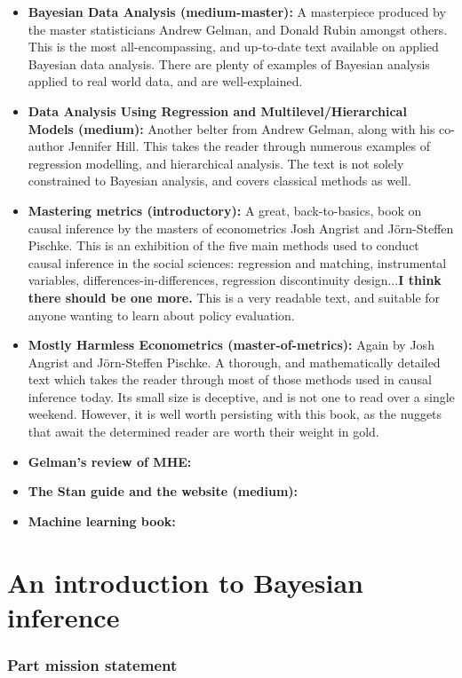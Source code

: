 \documentclass[11pt,fullpage]{book}
\begin{document}
\begin{itemize}
\item \textbf{Bayesian Data Analysis (medium-master): } A masterpiece produced by the master statisticians Andrew Gelman, and Donald Rubin amongst others. This is the most all-encompassing, and up-to-date text available on applied Bayesian data analysis. There are plenty of examples of Bayesian analysis applied to real world data, and are well-explained\cite{gelman2013bayesian}.
\item \textbf{Data Analysis Using Regression and Multilevel/Hierarchical Models (medium): } Another belter from Andrew Gelman, along with his co-author Jennifer Hill. This takes the reader through numerous examples of regression modelling, and hierarchical analysis. The text is not solely constrained to Bayesian analysis, and covers classical methods as well.
\item \textbf{Mastering metrics (introductory): } A great, back-to-basics, book on causal inference by the masters of econometrics Josh Angrist and Jörn-Steffen Pischke. This is an exhibition of the five main methods used to conduct causal inference in the social sciences: regression and matching, instrumental variables, differences-in-differences, regression discontinuity design...\textbf{I think there should be one more.} This is a very readable text, and suitable for anyone wanting to learn about policy evaluation.
\item \textbf{Mostly Harmless Econometrics (master-of-metrics): } Again by Josh Angrist and Jörn-Steffen Pischke. A thorough, and mathematically detailed text which takes the reader through most of those methods used in causal inference today. Its small size is deceptive, and is not one to read over a single weekend. However, it is well worth persisting with this book, as the nuggets that await the determined reader are worth their weight in gold.
\item \textbf{Gelman's review of MHE: }
\item \textbf{The Stan guide and the website (medium): }
\item \textbf{Machine learning book: }
\end{itemize}

\part{An introduction to Bayesian inference}\label{part:BayesianInferenceIntro}
\section{Part mission statement}
\end{document}
